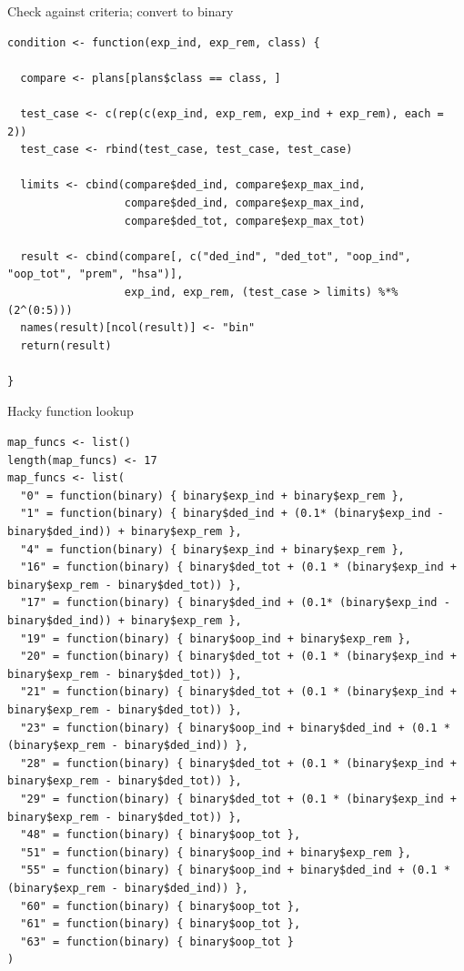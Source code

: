 \documentclass[sans,aspectratio=169,presentation,bigger,fleqn]{beamer}
\begin{document}
\begin{frame}[fragile,label=sec-23]{Check against criteria; convert to binary}
 \tiny
\begin{verbatim}
condition <- function(exp_ind, exp_rem, class) {
  
  compare <- plans[plans$class == class, ]
  
  test_case <- c(rep(c(exp_ind, exp_rem, exp_ind + exp_rem), each = 2))
  test_case <- rbind(test_case, test_case, test_case)
  
  limits <- cbind(compare$ded_ind, compare$exp_max_ind,
                  compare$ded_ind, compare$exp_max_ind, 
                  compare$ded_tot, compare$exp_max_tot)
  
  result <- cbind(compare[, c("ded_ind", "ded_tot", "oop_ind", "oop_tot", "prem", "hsa")],
                  exp_ind, exp_rem, (test_case > limits) %*% (2^(0:5)))
  names(result)[ncol(result)] <- "bin"
  return(result)
  
}
\end{verbatim}
\normalsize
\end{frame}
\begin{frame}[fragile,label=sec-24]{Hacky function lookup}
 \tiny
\begin{verbatim}
map_funcs <- list()
length(map_funcs) <- 17
map_funcs <- list(
  "0" = function(binary) { binary$exp_ind + binary$exp_rem }, 
  "1" = function(binary) { binary$ded_ind + (0.1* (binary$exp_ind - binary$ded_ind)) + binary$exp_rem }, 
  "4" = function(binary) { binary$exp_ind + binary$exp_rem }, 
  "16" = function(binary) { binary$ded_tot + (0.1 * (binary$exp_ind + binary$exp_rem - binary$ded_tot)) },
  "17" = function(binary) { binary$ded_ind + (0.1* (binary$exp_ind - binary$ded_ind)) + binary$exp_rem },
  "19" = function(binary) { binary$oop_ind + binary$exp_rem }, 
  "20" = function(binary) { binary$ded_tot + (0.1 * (binary$exp_ind + binary$exp_rem - binary$ded_tot)) }, 
  "21" = function(binary) { binary$ded_tot + (0.1 * (binary$exp_ind + binary$exp_rem - binary$ded_tot)) }, 
  "23" = function(binary) { binary$oop_ind + binary$ded_ind + (0.1 * (binary$exp_rem - binary$ded_ind)) },
  "28" = function(binary) { binary$ded_tot + (0.1 * (binary$exp_ind + binary$exp_rem - binary$ded_tot)) },
  "29" = function(binary) { binary$ded_tot + (0.1 * (binary$exp_ind + binary$exp_rem - binary$ded_tot)) },
  "48" = function(binary) { binary$oop_tot },   
  "51" = function(binary) { binary$oop_ind + binary$exp_rem }, 
  "55" = function(binary) { binary$oop_ind + binary$ded_ind + (0.1 * (binary$exp_rem - binary$ded_ind)) }, 
  "60" = function(binary) { binary$oop_tot }, 
  "61" = function(binary) { binary$oop_tot }, 
  "63" = function(binary) { binary$oop_tot }
)
\end{verbatim}
\normalsize
\end{frame}
\end{document}

